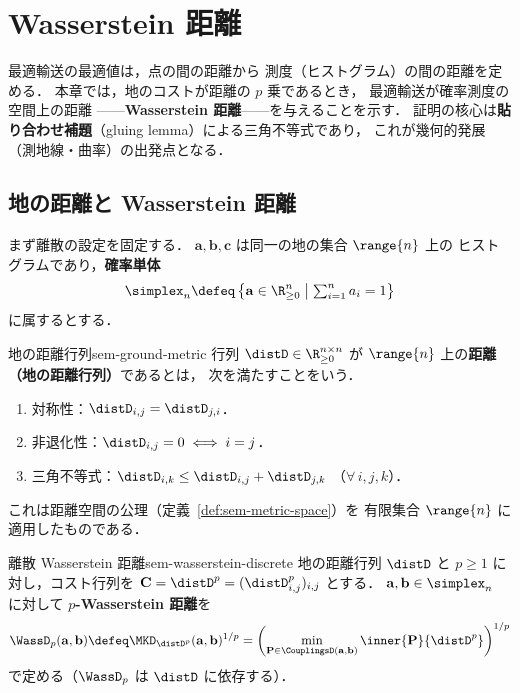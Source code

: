\chapter{Wasserstein 距離}
\label{ch:seminar-05-wasserstein}

最適輸送の最適値は，点の間の距離から
測度（ヒストグラム）の間の距離を定める．
本章では，地のコストが距離の $p$ 乗であるとき，
最適輸送が確率測度の空間上の距離
——\textbf{Wasserstein 距離}——を与えることを示す．
証明の核心は\textbf{貼り合わせ補題}（gluing lemma）による三角不等式であり，
これが幾何的発展（測地線・曲率）の出発点となる．

\section{地の距離と Wasserstein 距離}
\label{sec:sem-wasserstein-def}

まず離散の設定を固定する．
$\mathbf{a}, \mathbf{b}, \mathbf{c}$ は同一の地の集合 $\range{n}$ 上の
ヒストグラムであり，\textbf{確率単体}
\[
  \simplex_n
  \defeq
  \left\{
    \mathbf{a} \in \R_{\geq 0}^n
    \;\middle|\;
    \textstyle\sum_{i=1}^n a_i = 1
  \right\}
\]
に属するとする．

\begin{definition}{地の距離行列}{sem-ground-metric}
  行列 $\distD \in \R_{\geq 0}^{n \times n}$ が
  $\range{n}$ 上の\textbf{距離（地の距離行列）}であるとは，
  次を満たすことをいう．
  \begin{enumerate}
    \item[\textrm{(i)}] 対称性：$\distD_{i,j} = \distD_{j,i}$．
    \item[\textrm{(ii)}] 非退化性：$\distD_{i,j} = 0 \iff i = j$．
    \item[\textrm{(iii)}] 三角不等式：$\distD_{i,k} \leq \distD_{i,j} + \distD_{j,k}$
      （$\forall\, i, j, k$）．
  \end{enumerate}
  これは距離空間の公理（定義~\ref{def:sem-metric-space}）を
  有限集合 $\range{n}$ に適用したものである．
\end{definition}

\begin{definition}{離散 Wasserstein 距離}{sem-wasserstein-discrete}
  地の距離行列 $\distD$ と $p \geq 1$ に対し，コスト行列を
  $\mathbf{C} = \distD^p = (\distD_{i,j}^p)_{i,j}$ とする．
  $\mathbf{a}, \mathbf{b} \in \simplex_n$ に対して
  \textbf{$p$-Wasserstein 距離}を
  \[
    \WassD_p(\mathbf{a}, \mathbf{b})
    \defeq
    \MKD_{\distD^p}(\mathbf{a}, \mathbf{b})^{1/p}
    =
    \left(
      \min_{\mathbf{P} \in \CouplingsD(\mathbf{a}, \mathbf{b})}
      \inner{\mathbf{P}}{\distD^p}
    \right)^{1/p}
  \]
  で定める（$\WassD_p$ は $\distD$ に依存する）．
\end{definition}

